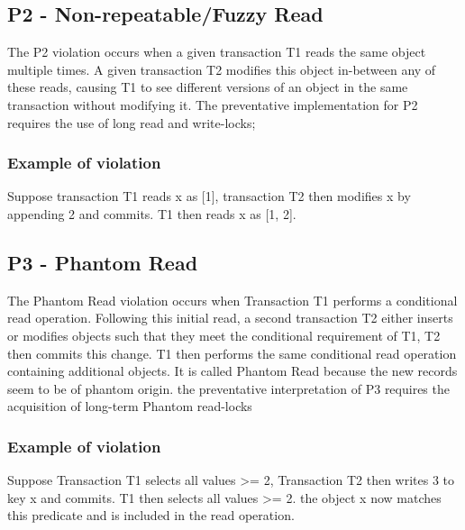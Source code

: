\documentclass[a4paper,10pt,titlepage]{report}
\begin{document}
\subsection{P2 - Non-repeatable/Fuzzy Read}
The P2 violation occurs when a given transaction T1 reads the same object multiple times. A given transaction T2 modifies this object in-between any of these reads, causing T1 to see different versions of an object in the same transaction without modifying it. The preventative implementation for P2 requires the use of long read and write-locks; 

\subsubsection{Example of violation}
Suppose transaction T1 reads x as [1], transaction T2 then modifies x by appending 2 and commits. T1 then reads x as [1, 2].\\
\vspace{2mm}

\vspace{2mm}
 


\subsection{P3 - Phantom Read}

The Phantom Read violation occurs when Transaction T1 performs a conditional read operation. Following this initial read, a second transaction T2 either inserts or modifies objects such that they meet the conditional requirement of T1, T2 then commits this change. T1 then performs the same conditional read operation containing additional objects. It is called Phantom Read because the new records seem to be of phantom origin. the preventative interpretation of P3 requires the acquisition of long-term Phantom read-locks

\subsubsection{Example of violation}

Suppose Transaction T1 selects all values >= 2, Transaction T2 then writes 3 to key x and commits. T1 then selects all values >= 2. the object x now matches this predicate and is included in the read operation. \\
\vspace{2mm}

\vspace{2mm}
\end{document}
